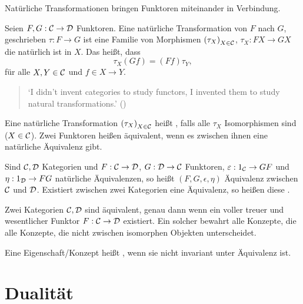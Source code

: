 \documentclass{book}
\begin{document}
Natürliche Transformationen bringen Funktoren miteinander in Verbindung.

\begin{definition}
    Seien $F, G:\mathcal{C}\rightarrow\mathcal{D}$ Funktoren. Eine natürliche Transformation von $F$ nach $G$, geschrieben $\tau:F\to G$ ist eine Familie von Morphismen ${(\tau_X)}_{X\in\mathcal{C}}$, $\tau_X:FX\to GX$ die natürlich ist in $X$. Das heißt, dass
    $$
    \tau_X (Gf) = (Ff) \tau_Y,
    $$
    für alle $X,Y\in\mathcal{C}$ und $f\in X\to Y$.
\end{definition}

\begin{quotation}
    `I didn't invent categories to study functors, I invented them to study natural transformations.' ()
\end{quotation}

\begin{definition}
    Eine natürliche Transformation ${(\tau_X)}_{X\in\mathcal{C}}$ heißt , falls alle $\tau_X$ Isomorphismen sind ($X\in\mathcal{C}$). Zwei Funktoren heißen äquivalent, wenn es zwischen ihnen eine natürliche Äquivalenz gibt.
\end{definition}

\begin{definition}
    Sind $\mathcal{C}, \mathcal{D}$ Kategorien und $F:\mathcal{C}\rightarrow\mathcal{D}$, $G:\mathcal{D}\rightarrow\mathcal{C}$ Funktoren,
    $\varepsilon:1_{\mathcal{C}}\rightarrow GF$ und $\eta:1_{\mathcal{D}}\rightarrow FG$ natürliche Äquivalenzen, so heißt $(F,G,\epsilon,\eta)$ Äquivalenz zwischen $\mathcal{C}$ und $\mathcal{D}$.
    Existiert zwischen zwei Kategorien eine Äquivalenz, so heißen diese .
\end{definition}

\begin{remark}
    Zwei Kategorien $\mathcal{C}, \mathcal{D}$ sind äquivalent, genau dann wenn ein voller treuer und wesentlicher Funktor $F:\mathcal{C}\rightarrow\mathcal{D}$ existiert. Ein solcher bewahrt alle Konzepte, die alle Konzepte, die nicht zwischen isomorphen Objekten unterscheidet.
\end{remark}

\begin{definition}
    Eine Eigenschaft/Konzept heißt , wenn sie nicht invariant unter Äquivalenz ist.
\end{definition}

\section{Dualität}
\end{document}
